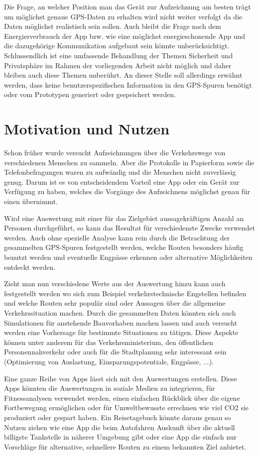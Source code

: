Die Frage, an welcher Position man das Gerät zur Aufzeichnung am besten trägt um möglichst genaue GPS-Daten zu erhalten wird nicht weiter verfolgt da die Daten möglichst realistisch sein sollen. Auch bleibt die Frage nach dem Energierverbrauch der App bzw. wie eine möglichst energieschonende App und die dazugehörige Kommunikation aufgebaut sein könnte unberücksichtigt. Schlussendlich ist eine umfassende Behandlung der Themen Sicherheit und Privatsphäre im Rahmen der vorliegenden Arbeit nicht möglich und daher bleiben auch diese Themen unberührt. An dieser Stelle soll allerdings erwähnt werden, dass keine benutzerspezifischen Information in den GPS-Spuren benötigt oder vom Prototypen generiert oder gespeichert werden.

\section{Motivation und Nutzen}
Schon früher wurde versucht Aufzeichnungen über die Verkehrswege von verschiedenen Menschen zu sammeln. Aber die Protokolle in Papierform sowie die Telefonbefragungen waren zu aufwändig und die Menschen nicht zuverlässig genug. Darum ist es von entscheidendem Vorteil eine App oder ein Gerät zur Verfügung zu haben, welches die Vorgänge des Aufzeichnens möglichst genau für einen übernimmt. \cite{zheng_understanding_2010}

Wird eine Auswertung mit einer für das Zielgebiet aussagekräftigen Anzahl an Personen durchgeführt, so kann das Resultat  für verschiedenste Zwecke verwendet werden. Auch ohne spezielle Analyse kann rein durch die Betrachtung der gesammelten GPS-Spuren festgestellt werden, welche Routen besonders häufig benutzt werden und eventuelle Engpässe erkennen oder alternative Möglichkeiten entdeckt werden.

Zieht man nun verschiedene Werte aus der Auswertung hinzu kann auch festgestellt werden wo sich zum Beispiel verkehrstechnische Engstellen befinden und welche Routen sehr populär sind oder Aussagen über die allgemeine Verkehrssituation machen. Durch die gesammelten Daten könnten sich auch Simulationen für anstehende Bauvorhaben machen lassen und auch versucht werden eine Vorhersage für bestimmte Situationen zu tätigen. Diese Aspekte können unter anderem für das Verkehrsministerium,  den öffentlichen Personennahverkehr oder auch für die Stadtplanung sehr interessant sein (Optimierung von Auslastung, Einsparungspotentiale, Engpässe, ...).

Eine ganze Reihe von Apps lässt sich mit den Auswertungen erstellen. Diese Apps könnten die Auswertungen in soziale Medien zu integrieren, für Fitnessanalysen verwendet werden, einen einfachen Rückblick über die eigene Fortbewegung ermöglichen oder für Umweltbewusste errechnen wie viel CO2 sie produziert oder gespart haben. Ein Reisetagebuch könnte daraus genau so Nutzen ziehen wie eine App die beim Autofahren Auskunft über die aktuell billigste Tankstelle in näherer Umgebung gibt oder eine App die einfach nur Vorschläge für alternative, schnellere Routen zu einem bekannten Ziel anbietet.

